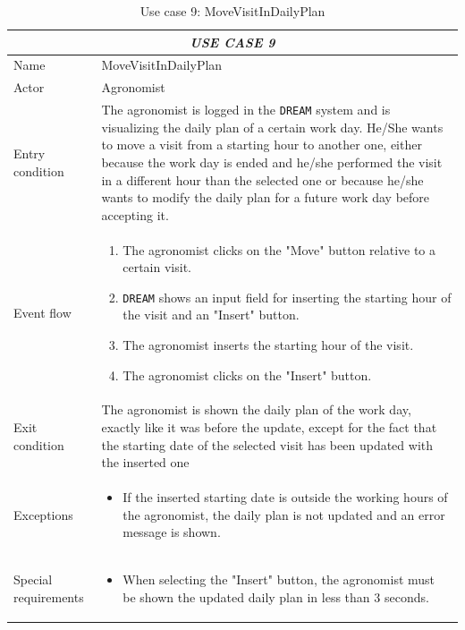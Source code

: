 \documentclass{article}
\begin{document}
\centering
\begin{longtable}{|p{3.5cm}|m{8cm}|}
\caption{Use case 9: MoveVisitInDailyPlan}
 \label{uc9}
 \hline
 \multicolumn{2}{|c|}{\cellcolor{white}\emph{USE CASE 9}} \\
 \endfirsthead
 \endhead
 \endfoot
 \endlastfoot
 \hline
 Name & MoveVisitInDailyPlan\\
 \hline
 Actor & Agronomist\\
 \hline
 Entry condition & The agronomist is logged in the \verb|DREAM| system and is visualizing the daily plan of a certain work day. He/She wants to move a visit from a starting hour to another one, either because the work day is ended and he/she performed the visit in a different hour than the selected one or because he/she wants to modify the daily plan for a future work day before accepting it.\\
 \hline
 Event flow & \begin{enumerate}
    \item The agronomist clicks on the "Move" button relative to a certain visit.
    \item \verb|DREAM| shows an input field for inserting the starting hour of the visit and an "Insert" button.
    \item The agronomist inserts the starting hour of the visit.
    \item The agronomist clicks on the "Insert" button.
 \end{enumerate}\\
 \hline
 Exit condition & The agronomist is shown the daily plan of the work day, exactly like it was before the update, except for the fact that the starting date of the selected visit has been updated with the inserted one\\
 \hline
 Exceptions & \begin{itemize}
     \item If the inserted starting date is outside the working hours of the agronomist, the daily plan is not updated and an error message is shown.
 \end{itemize}\\
 \hline
 Special requirements &\begin{itemize}
     \item When selecting the "Insert" button, the agronomist must be shown the updated daily plan in less than 3 seconds.
 \end{itemize}\\
 \hline
\end{longtable}
\end{document}
